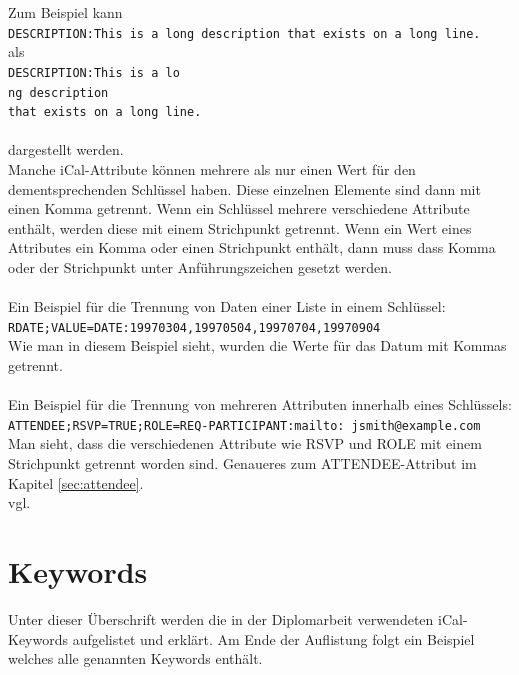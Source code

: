 Zum Beispiel kann\vspace*{2mm}\\
\texttt{DESCRIPTION:This is a long description that exists on a long line.}\vspace*{2mm}\\als\vspace*{2mm}\\
\texttt{DESCRIPTION:This is a lo\\ 
 ng description\\  
  that exists on a long line.}\\\\
dargestellt werden.\vspace*{2mm}\\
Manche iCal-Attribute können mehrere als nur einen Wert für den dementsprechenden Schlüssel haben. Diese einzelnen Elemente sind dann mit einen Komma getrennt. Wenn ein Schlüssel mehrere verschiedene Attribute enthält, werden diese mit einem Strichpunkt getrennt. Wenn ein Wert eines Attributes ein Komma oder einen Strichpunkt enthält, dann muss dass Komma oder der Strichpunkt unter Anführungszeichen gesetzt werden.\\\\
Ein Beispiel für die Trennung von Daten einer Liste in einem Schlüssel:\vspace*{2mm}\\
\texttt{RDATE;VALUE=DATE:19970304,19970504,19970704,19970904}\vspace*{2mm}\\
Wie man in diesem Beispiel sieht, wurden die Werte für das Datum mit Kommas getrennt.\\\\
Ein Beispiel für die Trennung von mehreren Attributen innerhalb eines Schlüssels:\vspace*{2mm}\\
\texttt{ATTENDEE;RSVP=TRUE;ROLE=REQ-PARTICIPANT:mailto:
jsmith@example.com}\vspace*{2mm}\\Man sieht, dass die verschiedenen Attribute wie RSVP und ROLE mit einem Strichpunkt getrennt worden sind. Genaueres zum ATTENDEE-Attribut im Kapitel \ref{sec:attendee}. 
\\vgl. \textcite{iCalDocumentation} 

\pagebreak
\renewcommand{\theauthor}{Dario Wagner}
\section{Keywords}
\label{sec:keywords}
Unter dieser Überschrift werden die in der Diplomarbeit verwendeten iCal-Keywords aufgelistet und erklärt. Am Ende der Auflistung folgt ein Beispiel welches alle genannten Keywords enthält. 
